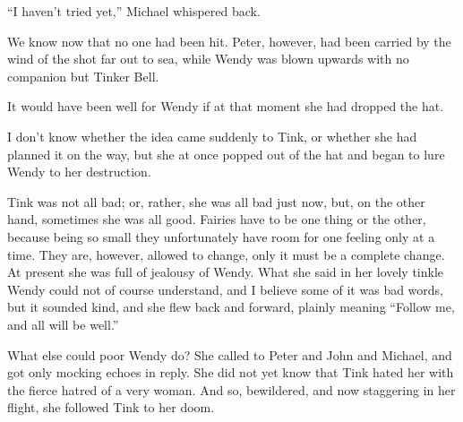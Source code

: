 “I haven’t tried yet,” Michael whispered back.

We know now that no one had been hit.
Peter, however, had been carried by the wind of the shot far out to sea,
while Wendy was blown upwards with no companion but Tinker Bell.

It would have been well for Wendy if at that moment she had dropped the hat.

I don’t know whether the idea came suddenly to Tink, or whether she had planned it on the way,
but she at once popped out of the hat and began to lure Wendy to her destruction.

Tink was not all bad;
or, rather, she was all bad just now, but, on the other hand, sometimes she was all good.
Fairies have to be one thing or the other,
because being so small they unfortunately have room for one feeling only at a time.
They are, however, allowed to change, only it must be a complete change.
At present she was full of jealousy of Wendy.
What she said in her lovely tinkle Wendy could not of course understand,
and I believe some of it was bad words, but it sounded kind,
and she flew back and forward, plainly meaning “Follow me, and all will be well.”

What else could poor Wendy do?
She called to Peter and John and Michael,
and got only mocking echoes in reply.
She did not yet know that Tink hated her with the fierce hatred of a very woman.
And so, bewildered, and now staggering in her flight,
she followed Tink to her doom.

\endinput
